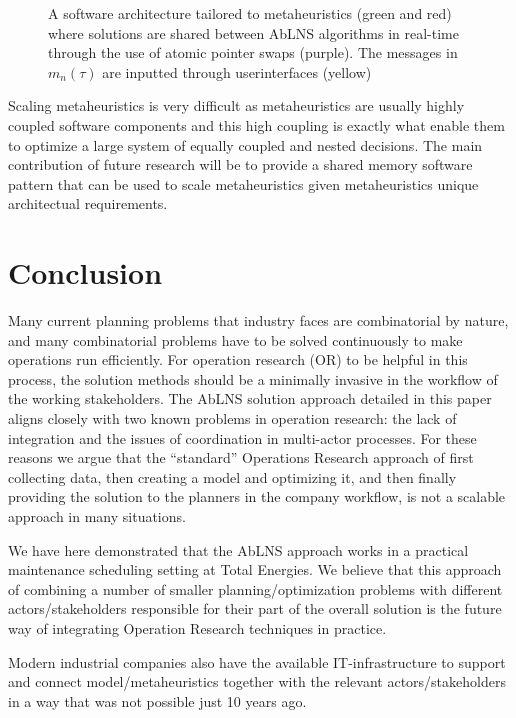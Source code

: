 \begin{figure}[H]
	
	\centering
	\resizebox{12cm}{!}{
		\drawModelSetupHexagon[simplified=true]
	}
	\caption{A software architecture tailored to metaheuristics (green and red)
		where solutions are shared between AbLNS algorithms in real-time through the
		use of atomic pointer swaps (purple). The messages in $m_{n}^{}(\tau)$ are
		inputted through userinterfaces (yellow)
	}\label{fig:discussion:hexagon-setup}
\end{figure}

Scaling metaheuristics is very difficult as metaheuristics are usually highly coupled
software components and this high coupling is exactly what enable them to optimize
a large system of equally coupled and nested decisions. The main contribution of 
future research will be to provide a shared memory software pattern that can be 
used to scale metaheuristics given metaheuristics unique architectual requirements.

\section{Conclusion}
Many current planning problems that industry faces are combinatorial by
nature, and many combinatorial problems have to be solved continuously to
make operations run efficiently. For operation research (OR) to be helpful
in this process, the solution methods should be a minimally invasive in the
workflow of the working stakeholders. The AbLNS solution approach detailed in
this paper aligns closely with two known problems in operation research: the
lack of integration and the issues of coordination in multi-actor processes.
For these reasons we argue that the ``standard'' Operations Research approach
of first collecting data, then creating a model and optimizing it, and then
finally providing the solution to the planners in the company workflow, is not a
scalable approach in many situations.

We have here demonstrated that the AbLNS approach works in a practical
maintenance scheduling setting at Total Energies. We believe that this approach
of combining a number of smaller planning/optimization problems with different
actors/stakeholders responsible for their part of the overall solution is the
future way of integrating Operation Research techniques in practice.

Modern industrial companies also have the available IT-infrastructure to support
and connect model/metaheuristics together with the relevant actors/stakeholders
in a way that was not possible just 10 years ago.

